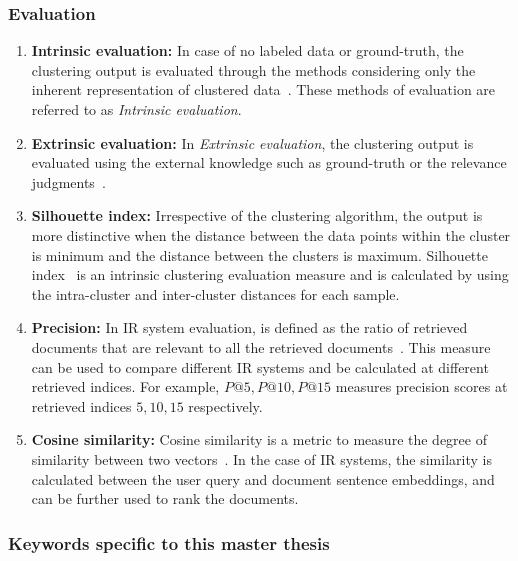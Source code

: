 \documentclass[master,proposal,extern,palatino]{rgseThesis}
\begin{document}
\subsubsection{Evaluation}

\begin{enumerate}
	
	\item{\textbf{Intrinsic evaluation:}} In case of no labeled data or ground-truth, the clustering output is evaluated through the methods considering only the inherent representation of clustered data~\cite{de2012document}. These methods of evaluation are referred to as \textit{Intrinsic evaluation}. 
	
	\item{\textbf{Extrinsic evaluation:}} In \textit{Extrinsic evaluation}, the clustering output is evaluated using the external knowledge such as ground-truth or the relevance judgments~\cite{de2012document}. 
	
	\item{\textbf{Silhouette index:}} Irrespective of the clustering algorithm, the output is more distinctive when
	the distance between the data points within the cluster is minimum and the distance between
	the clusters is maximum. Silhouette index~\cite{rousseeuw1987silhouettes} is an intrinsic clustering evaluation measure and is calculated by using the intra-cluster and inter-cluster distances for each sample. 
 
	\item{\textbf{Precision:}} In IR system evaluation,  is defined as the ratio of retrieved documents that are relevant to all the retrieved documents~\cite{zuva2012evaluation}. This measure can be used to compare different IR systems and be calculated at different retrieved indices. For example, $P@5, P@10, P@15$ measures precision scores at retrieved indices $5, 10, 15$ respectively.
	
	\item{\textbf{Cosine similarity:}} Cosine similarity is a metric to measure the degree of similarity between two vectors~\cite{lahitani2016cosine}. In the case of IR systems, the similarity is calculated between the user query and document sentence embeddings, and can be further used to rank the documents.
	 
\end{enumerate}	


\subsubsection{Keywords specific to this master thesis}
\end{document}
